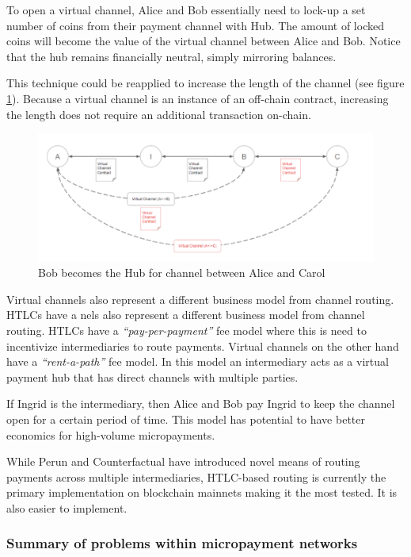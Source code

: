 \documentclass[a4paper,12pt]{article}
\begin{document}
To open a virtual channel, Alice and Bob essentially need to lock-up a set number 
of coins from their payment channel with Hub. The amount of locked coins will 
become the value of the virtual channel between Alice and Bob. Notice that the hub 
remains financially neutral, simply mirroring balances.

This technique could be reapplied to increase the length of the channel (see figure 
\ref{img:virtual-channels}). Because a virtual channel is an instance of an 
off-chain contract, increasing the length does not require an additional transaction
on-chain. 

\begin{figure}[H]
    \centering
    \includegraphics[scale=0.6]{../img/virtual-channels}
    \caption{Bob becomes the Hub for channel between Alice and Carol}
    \label{img:virtual-channels}
\end{figure}

Virtual channels also represent a different business model from channel routing. 
HTLCs have a nels also represent a different business model from channel routing.
HTLCs have a \textit{“pay-per-payment”} fee model where this is need to incentivize 
intermediaries to route payments. Virtual channels on the other hand have a 
\textit{“rent-a-path”} fee model. In this model an intermediary acts as a virtual 
payment hub that has direct channels with multiple parties.

If Ingrid is the intermediary, then Alice and Bob pay Ingrid to keep the channel 
open for a certain period of time. This model has potential to have better economics 
for high-volume micropayments. 

While Perun and Counterfactual have introduced novel means of routing payments 
across multiple intermediaries, HTLC-based routing is currently the primary 
implementation on blockchain mainnets making it the most tested. It is also easier 
to implement.

\subsubsection{Summary of problems within micropayment networks}
\end{document}

